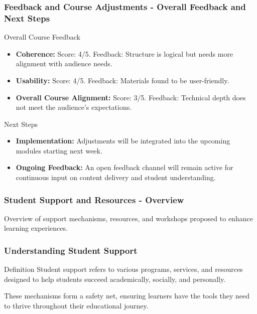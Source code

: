 \documentclass[aspectratio=169]{beamer}
\begin{document}
\begin{frame}[fragile]
    \frametitle{Feedback and Course Adjustments - Overall Feedback and Next Steps}
    \begin{block}{Overall Course Feedback}
        \begin{itemize}
            \item \textbf{Coherence:} Score: 4/5. Feedback: Structure is logical but needs more alignment with audience needs.
            \item \textbf{Usability:} Score: 4/5. Feedback: Materials found to be user-friendly.
            \item \textbf{Overall Course Alignment:} Score: 3/5. Feedback: Technical depth does not meet the audience's expectations.
        \end{itemize}
    \end{block}

    \begin{block}{Next Steps}
        \begin{itemize}
            \item \textbf{Implementation:} Adjustments will be integrated into the upcoming modules starting next week.
            \item \textbf{Ongoing Feedback:} An open feedback channel will remain active for continuous input on content delivery and student understanding.
        \end{itemize}
    \end{block}
\end{frame}

\begin{frame}[fragile]
    \frametitle{Student Support and Resources - Overview}
    Overview of support mechanisms, resources, and workshops proposed to enhance learning experiences.
\end{frame}

\begin{frame}[fragile]
    \frametitle{Understanding Student Support}
    \begin{block}{Definition}
        Student support refers to various programs, services, and resources designed to help students succeed academically, socially, and personally.
    \end{block}
    These mechanisms form a safety net, ensuring learners have the tools they need to thrive throughout their educational journey.
\end{frame}
\end{document}
